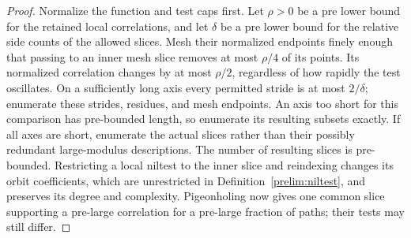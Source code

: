\begin{proof}
Normalize the function and test caps first.
Let $\rho>0$ be a pre lower bound for the retained local correlations,
and let $\delta$ be a pre lower bound for the relative side counts of
the allowed slices.  Mesh their normalized endpoints finely enough
that passing to an inner mesh slice removes at most $\rho/4$ of its
points.  Its normalized correlation changes by at most $\rho/2$,
regardless of how rapidly the test oscillates.  On a sufficiently
long axis every permitted stride is at most $2/\delta$; enumerate
these strides, residues, and mesh endpoints.  An axis too short for
this comparison has pre-bounded length, so enumerate its resulting
subsets exactly.  If all axes are short, enumerate the actual slices
rather than their possibly redundant large-modulus descriptions.
The number of resulting slices is pre-bounded.  Restricting a local
niltest to the inner slice and reindexing changes its orbit
coefficients, which are unrestricted in Definition~\ref{prelim:niltest},
and preserves its degree and complexity.  Pigeonholing now gives one
common slice supporting a pre-large correlation for a pre-large
fraction of paths; their tests may still differ.


\end{proof}
